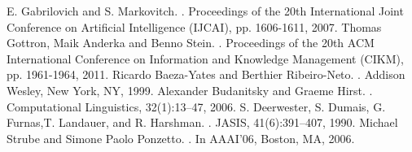 \documentclass[journal,transmag]{IEEEtran}
\begin{document}
\newpage

\begin{thebibliography}{1}
E. Gabrilovich and S. Markovitch.
.
\newblock Proceedings of the 20th International Joint Conference on Artificial Intelligence (IJCAI), pp. 1606-1611, 2007.
Thomas Gottron, Maik Anderka and Benno Stein.
.
\newblock Proceedings of the 20th ACM International Conference on Information and Knowledge Management (CIKM), pp. 1961-1964, 2011.
Ricardo Baeza-Yates and Berthier Ribeiro-Neto.
.
\newblock Addison Wesley, New York, NY, 1999.
Alexander Budanitsky and Graeme Hirst.
.
\newblock Computational Linguistics, 32(1):13–47, 2006.
S. Deerwester, S. Dumais, G. Furnas,T. Landauer, and R. Harshman.
.
\newblock JASIS, 41(6):391–407, 1990.
Michael Strube and Simone Paolo Ponzetto.
.
\newblock In AAAI’06, Boston, MA, 2006.
\end{thebibliography}
\end{document}
